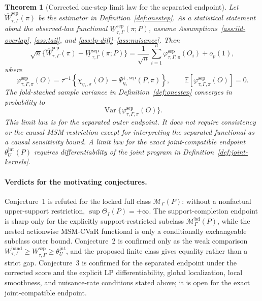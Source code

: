 \documentclass[11pt]{article}
\newcommand{\E}{\mathbb{E}}
\theoremstyle{definition}
\theoremstyle{plain}
\newtheorem{theorem}{Theorem}
\theoremstyle{remark}
\begin{document}
\begin{theorem}[Corrected one-step limit law for the separated endpoint]\label{thm:onestep-limit}\label{prop:onestep-limit}\label{conj:onestep-limit}
Let \(\widehat W_{\tau,\Gamma}^{\mathrm{sep}}(\pi)\) be the estimator in
Definition~\ref{def:onestep}.  As a statistical statement about the observed-law
functional \(\underline W_{\tau,\Gamma}^{\mathrm{sep}}(\pi;P)\), assume
Assumptions~\ref{ass:iid-overlap}, \ref{ass:tail}, and
\ref{ass:lp-diff}--\ref{ass:nuisance}.  Then
\[
\sqrt n\{
\widehat W_{\tau,\Gamma}^{\mathrm{sep}}(\pi)
-
\underline W_{\tau,\Gamma}^{\mathrm{sep}}(\pi;P)
\}
=
\frac{1}{\sqrt n}\sum_{i=1}^n
\varphi_{\tau,\Gamma,\pi}^{\mathrm{sep}}(O_i)+o_p(1),
\]
where
\[
\varphi_{\tau,\Gamma,\pi}^{\mathrm{sep}}(O)
=
\tau^{-1}
\left\{
\chi_{\eta_*,\pi}(O)
-
\Psi_{\eta_*}^{+,\mathrm{sep}}(P,\pi)
\right\},
\qquad
\E[\varphi_{\tau,\Gamma,\pi}^{\mathrm{sep}}(O)]=0.
\]
The fold-stacked sample variance in Definition~\ref{def:onestep} converges in
probability to
\[
\operatorname{Var}\{\varphi_{\tau,\Gamma,\pi}^{\mathrm{sep}}(O)\}.
\]
This limit law is for the separated outer endpoint.  It does not require
consistency or the causal MSM restriction except for interpreting the separated
functional as a causal sensitivity bound.  A limit law for the exact
joint-compatible endpoint \(\theta_U^{\mathrm{jnt}}(P)\) requires
differentiability of the joint program in Definition~\ref{def:joint-kernels}.
\end{theorem}

\paragraph{Verdicts for the motivating conjectures.}
Conjecture~1 is refuted for the locked full class
\(\mathcal M_\Gamma(P)\): without a nonfactual upper-support restriction,
\(\sup\Theta_I(P)=+\infty\).  The support-completion endpoint is sharp only for
the explicitly support-restricted subclass
\(\mathcal M_\Gamma^{\mathrm{bd}}(P)\), while the nested actionwise MSM-CVaR
functional is only a conditionally exchangeable subclass outer bound.
Conjecture~2 is confirmed only as the weak comparison
\(W_{\tau,\Gamma}^{\mathrm{band}}\ge
\underline W_{\tau,\Gamma}^{\mathrm{sep}}\ge\theta_U^{\mathrm{jnt}}\), and the
proposed finite class gives equality rather than a strict gap.  Conjecture~3 is
confirmed for the separated endpoint under the corrected score and the explicit
LP differentiability, global localization, local smoothness, and nuisance-rate
conditions stated above; it is open for the exact joint-compatible endpoint.
\end{document}

